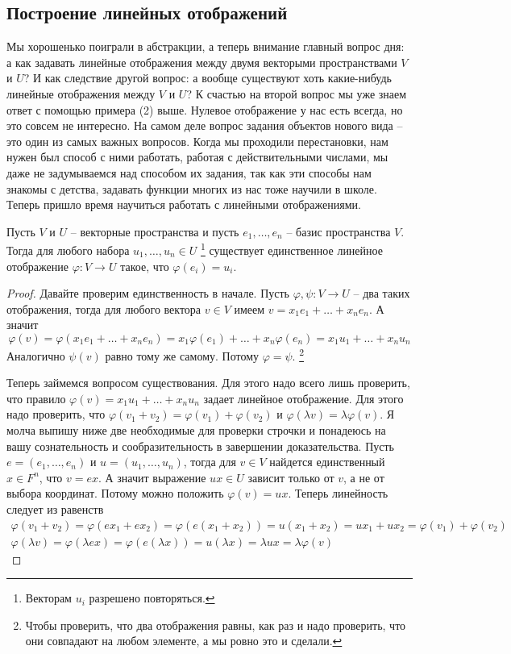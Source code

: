 \subsection{Построение линейных отображений}

Мы хорошенько поиграли в абстракции, а теперь внимание главный вопрос дня: а как задавать линейные отображения между двумя векторыми пространствами $V$ и $U$?
И как следствие другой вопрос: а вообще существуют хоть какие-нибудь линейные отображения между $V$ и $U$?
К счастью на второй вопрос мы уже знаем ответ с помощью примера (2) выше.
Нулевое отображение у нас есть всегда, но это совсем не интересно.
На самом деле вопрос задания объектов нового вида -- это один из самых важных вопросов.
Когда мы проходили перестановки, нам нужен был способ с ними работать, работая с действительными числами, мы даже не задумываемся над способом их задания, так как эти способы нам знакомы с детства, задавать функции многих из нас тоже научили в школе.
Теперь пришло время научиться работать с линейными отображениями.

\begin{claim}
\label{claim::LinMapExist}
Пусть $V$ и $U$ -- векторные пространства и пусть $e_1,\ldots,e_n$ -- базис пространства $V$.
Тогда для любого набора $u_1,\ldots,u_n\in U$%
\footnote{Векторам $u_i$ разрешено повторяться.}
существует единственное линейное отображение $\varphi\colon V\to U$ такое, что $\varphi(e_i) = u_i$.
\end{claim}
\begin{proof}

Давайте проверим единственность в начале.
Пусть $\varphi,\psi\colon V\to U$ -- два таких отображения, тогда для любого вектора $v\in V$ имеем $v = x_1 e_1 + \ldots + x_n e_n$.
А значит
\[
\varphi(v) = \varphi(x_1 e_1 + \ldots + x_n e_n) = x_1 \varphi(e_1) + \ldots + x_n \varphi(e_n) = x_1 u_1 + \ldots + x_n u_n
\]
Аналогично $\psi(v)$ равно тому же самому.
Потому $\varphi = \psi$.%
\footnote{Чтобы проверить, что два отображения равны, как раз и надо проверить, что они совпадают на любом элементе, а мы ровно это и сделали.}

Теперь займемся вопросом существования.
Для этого надо всего лишь проверить, что правило $\varphi(v) =  x_1 u_1 + \ldots + x_n u_n$ задает линейное отображение.
Для этого надо проверить, что $\varphi(v_1 + v_2) = \varphi(v_1) + \varphi(v_2)$ и $\varphi(\lambda v) = \lambda \varphi(v)$.
Я молча выпишу ниже две необходимые для проверки строчки и понадеюсь на вашу сознательность и сообразительность в завершении доказательства.
Пусть $e = (e_1,\ldots,e_n)$ и $u = (u_1,\ldots, u_n)$, тогда для $v\in V$ найдется единственный $x\in F^n$, что $v = ex$.
А значит выражение $ux\in U$ зависит только от $v$, а не от выбора координат.
Потому можно положить $\varphi(v) = ux$.
Теперь линейность следует из равенств
\begin{gather*}
\varphi(v_1 + v_2) = \varphi(ex_1 + ex_2) = \varphi(e(x_1 + x_2)) = u(x_1 + x_2) = u x_1 + ux_2 = \varphi(v_1) + \varphi(v_2)\\
\varphi(\lambda v) = \varphi(\lambda ex) = \varphi(e(\lambda x)) = u (\lambda x) = \lambda u x = \lambda \varphi(v)
\end{gather*}
\end{proof}

